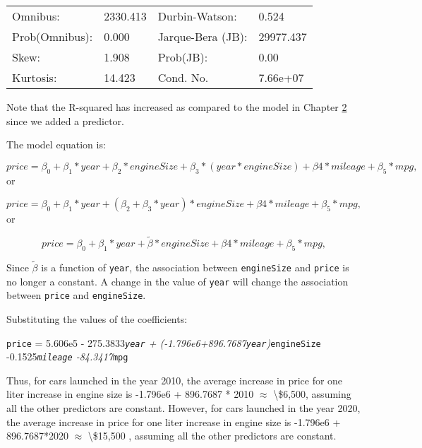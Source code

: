\documentclass[
  letterpaper,
  DIV=11,
  numbers=noendperiod]{scrreprt}
\begin{document}
\begin{longtable}[]{@{}llll@{}}
\toprule\noalign{}
\endhead
\bottomrule\noalign{}
\endlastfoot
Omnibus: & 2330.413 & Durbin-Watson: & 0.524 \\
Prob(Omnibus): & 0.000 & Jarque-Bera (JB): & 29977.437 \\
Skew: & 1.908 & Prob(JB): & 0.00 \\
Kurtosis: & 14.423 & Cond. No. & 7.66e+07 \\
\end{longtable}

Note that the R-squared has increased as compared to the model in
Chapter
\href{https://nustat.github.io/STAT303-2-class-notes/Lec2_MultipleLinearRegression.html}{2}
since we added a predictor.

The model equation is:

\begin{equation}
price = \beta_0 + \beta_1*year + \beta_2*engineSize + \beta_3*(year * engineSize) + \beta4*mileage + \beta_5*mpg,
\end{equation}or

\begin{equation}
price = \beta_0 + \beta_1*year + (\beta_2+\beta_3*year)*engineSize + \beta4*mileage + \beta_5*mpg,
\end{equation}or

\begin{equation}
price = \beta_0 + \beta_1*year + \tilde \beta*engineSize + \beta4*mileage + \beta_5*mpg,
\end{equation}

Since \(\tilde \beta\) is a function of \texttt{year}, the association
between \texttt{engineSize} and \texttt{price} is no longer a constant.
A change in the value of \texttt{year} will change the association
between \texttt{price} and \texttt{engineSize}.

Substituting the values of the coefficients:

\texttt{price} = 5.606e5 - 275.3833\emph{\texttt{year} +
(-1.796e6+896.7687\texttt{year})}\texttt{engineSize}
-0.1525\emph{\texttt{mileage} -84.3417}\texttt{mpg}

Thus, for cars launched in the year 2010, the average increase in price
for one liter increase in engine size is -1.796e6 + 896.7687 * 2010
\(\approx\) \textbackslash\$6,500, assuming all the other predictors are
constant. However, for cars launched in the year 2020, the average
increase in price for one liter increase in engine size is -1.796e6 +
896.7687*2020 \(\approx\) \textbackslash\$15,500 , assuming all the
other predictors are constant.
\end{document}
